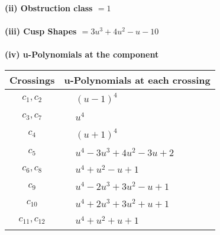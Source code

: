 \documentclass[1p]{elsarticle_modified}
\theoremstyle{definition}
\begin{document}
\flushleft \textbf{(ii) Obstruction class $= 1$}\\~\\
\flushleft \textbf{(iii) Cusp Shapes $= 3 u^3+4 u^2- u-10$}\\~\\
\newpage\renewcommand{\arraystretch}{1}
\flushleft \textbf{(iv) u-Polynomials at the component}\newline \\
\begin{tabular}{m{50pt}|m{274pt}}
Crossings & \hspace{64pt}u-Polynomials at each crossing \\
\hline $$\begin{aligned}c_{1},c_{2}\end{aligned}$$&$\begin{aligned}
&(u-1)^4
\end{aligned}$\\
\hline $$\begin{aligned}c_{3},c_{7}\end{aligned}$$&$\begin{aligned}
&u^4
\end{aligned}$\\
\hline $$\begin{aligned}c_{4}\end{aligned}$$&$\begin{aligned}
&(u+1)^4
\end{aligned}$\\
\hline $$\begin{aligned}c_{5}\end{aligned}$$&$\begin{aligned}
&u^4-3 u^3+4 u^2-3 u+2
\end{aligned}$\\
\hline $$\begin{aligned}c_{6},c_{8}\end{aligned}$$&$\begin{aligned}
&u^4+u^2- u+1
\end{aligned}$\\
\hline $$\begin{aligned}c_{9}\end{aligned}$$&$\begin{aligned}
&u^4-2 u^3+3 u^2- u+1
\end{aligned}$\\
\hline $$\begin{aligned}c_{10}\end{aligned}$$&$\begin{aligned}
&u^4+2 u^3+3 u^2+u+1
\end{aligned}$\\
\hline $$\begin{aligned}c_{11},c_{12}\end{aligned}$$&$\begin{aligned}
&u^4+u^2+u+1
\end{aligned}$\\
\hline
\end{tabular}\\~\\
\end{document}

